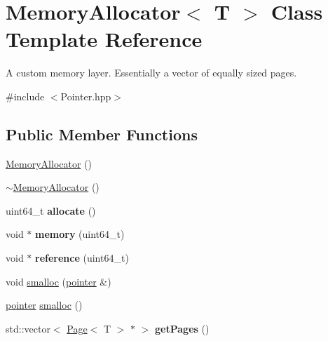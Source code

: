 \hypertarget{class_memory_allocator}{}\section{Memory\+Allocator$<$ T $>$ Class Template Reference}
\label{class_memory_allocator}


A custom memory layer. Essentially a vector of equally sized pages.  




{\ttfamily \#include $<$Pointer.\+hpp$>$}

\subsection*{Public Member Functions}
\begin{DoxyCompactItemize}
\item 
\hyperlink{class_memory_allocator_a9c7ca60e8881012d0311c98689359c91}{Memory\+Allocator} ()
\item 
\hyperlink{class_memory_allocator_a06ba8aa77baa4fea0096da7f0c720e7b}{$\sim$\+Memory\+Allocator} ()
\item 
\mbox{\label{class_memory_allocator_a3666385085a0766287a7406f192ad2d3}} 
uint64\+\_\+t {\bfseries allocate} ()
\item 
\mbox{\label{class_memory_allocator_a349594e91676987dd38c49d8e9ed60fc}} 
void $\ast$ {\bfseries memory} (uint64\+\_\+t)
\item 
\mbox{\label{class_memory_allocator_a0e68bf95dfe75d4db24fb765cfa7c0fb}} 
void $\ast$ {\bfseries reference} (uint64\+\_\+t)
\item 
void \hyperlink{class_memory_allocator_a0afd80ad46c6631bc7986d8a3fe36f3c}{smalloc} (\hyperlink{structpointer}{pointer} \&)
\item 
\hyperlink{structpointer}{pointer} \hyperlink{class_memory_allocator_a8712abdd481153bf70734258bfc3f8b9}{smalloc} ()
\item 
\mbox{\label{class_memory_allocator_a528a642157870b5d8e667a0cf4fcebfd}} 
std\+::vector$<$ \hyperlink{class_page}{Page}$<$ T $>$ $\ast$ $>$ {\bfseries get\+Pages} ()
\end{DoxyCompactItemize}


